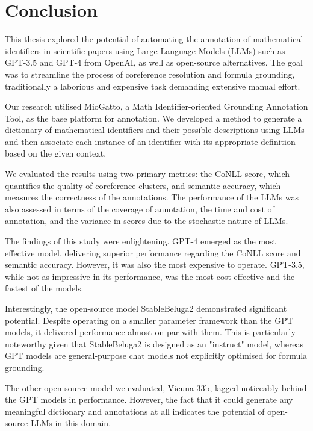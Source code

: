\chapter{Conclusion}\label{chapter:conclusion}

This thesis explored the potential of automating the annotation of mathematical identifiers in scientific papers using Large Language Models (LLMs) such as GPT-3.5 and GPT-4 from OpenAI, as well as open-source alternatives. The goal was to streamline the process of coreference resolution and formula grounding, traditionally a laborious and expensive task demanding extensive manual effort. 

Our research utilised MioGatto, a Math Identifier-oriented Grounding Annotation Tool, as the base platform for annotation. We developed a method to generate a dictionary of mathematical identifiers and their possible descriptions using LLMs and then associate each instance of an identifier with its appropriate definition based on the given context. 

We evaluated the results using two primary metrics: the CoNLL score, which quantifies the quality of coreference clusters, and semantic accuracy, which measures the correctness of the annotations. The performance of the LLMs was also assessed in terms of the coverage of annotation, the time and cost of annotation, and the variance in scores due to the stochastic nature of LLMs. 

The findings of this study were enlightening. GPT-4 emerged as the most effective model, delivering superior performance regarding the CoNLL score and semantic accuracy. However, it was also the most expensive to operate. GPT-3.5, while not as impressive in its performance, was the most cost-effective and the fastest of the models. 

Interestingly, the open-source model StableBeluga2 demonstrated significant potential. Despite operating on a smaller parameter framework than the GPT models, it delivered performance almost on par with them. This is particularly noteworthy given that StableBeluga2 is designed as an "instruct" model, whereas GPT models are general-purpose chat models not explicitly optimised for formula grounding. 

The other open-source model we evaluated, Vicuna-33b, lagged noticeably behind the GPT models in performance. However, the fact that it could generate any meaningful dictionary and annotations at all indicates the potential of open-source LLMs in this domain. 

